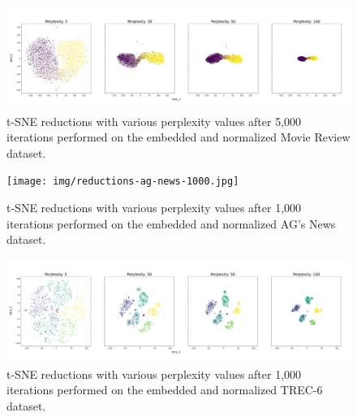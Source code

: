 \documentclass[english,bachelor,ul]{webisthesis} %
\begin{document}
\begin{figure}[htbp]
    \centering
    \includegraphics[width=1\textwidth]{img/reductions-mr-5000.jpg}
    \caption{t-SNE reductions with various perplexity values after 5,000 iterations performed on the embedded and normalized Movie Review dataset.}
    \label{fig:reductions-mr-5000}
\end{figure}

\begin{figure}[htbp]
    \centering
    \texttt{[image: img/reductions-ag-news-1000.jpg]}
    \caption{t-SNE reductions with various perplexity values after 1,000 iterations performed on the embedded and normalized AG's News dataset.}
    \label{fig:reductions-agnews-1000}
\end{figure}

\begin{figure}[htbp]
    \centering
    \includegraphics[width=1\textwidth]{img/reductions-trec-1000.jpg}
    \caption{t-SNE reductions with various perplexity values after 1,000 iterations performed on the embedded and normalized TREC-6 dataset.}
    \label{fig:reductions-trec-1000}
\end{figure}

\fi


\end{document}
